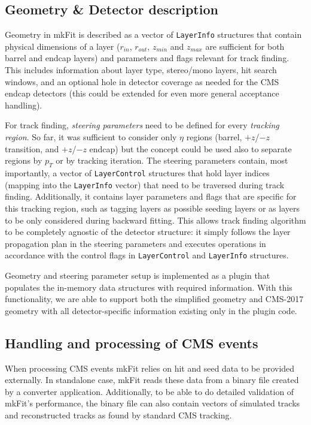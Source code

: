 \documentclass{webofc}
\def\mkfit{mkFit\xspace}
\def\stt#1{{\small\texttt{#1}}}
\begin{document}
\subsection{Geometry \& Detector description}

Geometry in \mkfit is described as a vector of \stt{LayerInfo} structures
that contain physical dimensions of a layer ($r_{in}$, $r_{out}$, $z_{min}$
and $z_{max}$ are sufficient for both barrel and endcap layers) and parameters
and flags relevant for track finding. This includes information about layer
type, stereo/mono layers, hit search windows, and an optional hole in detector
coverage as needed for the CMS endcap detectors (this could be extended for
even more general acceptance handling).

For track finding, \emph{steering parameters} need to be defined for every
\emph{tracking region}. So far, it was sufficient to consider only $\eta$
regions (barrel, $+z$/$-z$ transition, and $+z$/$-z$ endcap) but the concept
could be used also to separate regions by $p_T$ or by tracking iteration. The
steering parameters contain, most importantly, a vector of \stt{LayerControl}
structures that hold layer indices (mapping into the \stt{LayerInfo} vector)
that need to be traversed during track finding. Additionally, it contains
layer parameters and flags that are specific for this tracking region, such as
tagging layers as possible seeding layers or as layers to be only considered
during backward fitting. This allows track finding algorithm to be completely
agnostic of the detector structure: it simply follows the layer propagation
plan in the steering parameters and executes operations in accordance with the
control flags in \stt{LayerControl} and \stt{LayerInfo} structures.

Geometry and steering parameter setup is implemented as a plugin that
populates the in-memory data structures with required information. With this
functionality, we are able to support both the simplified geometry and
CMS-2017 geometry with all detector-specific information existing only in the
plugin code.

\subsection{Handling and processing of CMS events}
\label{ssec:cms-event-processing}

When processing CMS events \mkfit relies on hit and seed data to be provided
externally. In standalone case, \mkfit reads these data from a binary file
created by a converter application. Additionally, to be able to do detailed
validation of \mkfit's performance, the binary file can also contain vectors
of simulated tracks and reconstructed tracks as found by standard CMS tracking.
\end{document}
